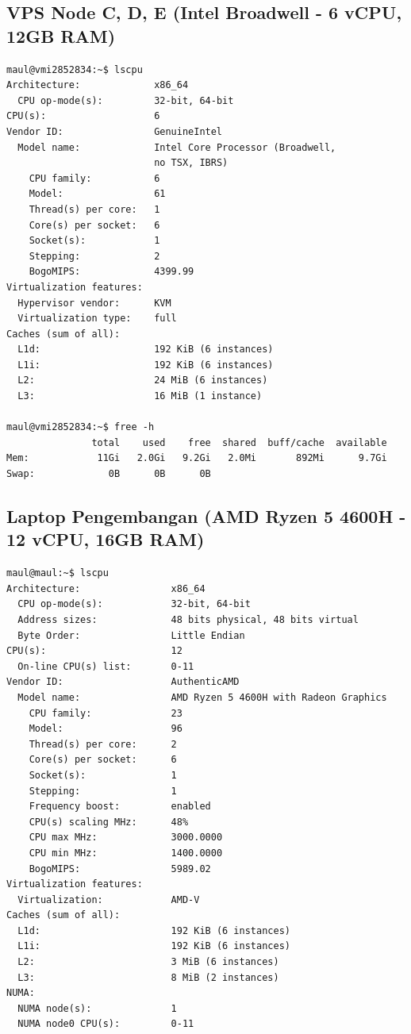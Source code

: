 \subsection{VPS Node C, D, E (Intel Broadwell - 6 vCPU, 12GB RAM)}
\begin{lstlisting}[basicstyle=\footnotesize, breaklines=true, numbers=none]
maul@vmi2852834:~$ lscpu
Architecture:             x86_64
  CPU op-mode(s):         32-bit, 64-bit
CPU(s):                   6
Vendor ID:                GenuineIntel
  Model name:             Intel Core Processor (Broadwell, 
                          no TSX, IBRS)
    CPU family:           6
    Model:                61
    Thread(s) per core:   1
    Core(s) per socket:   6
    Socket(s):            1
    Stepping:             2
    BogoMIPS:             4399.99
Virtualization features:  
  Hypervisor vendor:      KVM
  Virtualization type:    full
Caches (sum of all):      
  L1d:                    192 KiB (6 instances)
  L1i:                    192 KiB (6 instances)
  L2:                     24 MiB (6 instances)
  L3:                     16 MiB (1 instance)

maul@vmi2852834:~$ free -h
               total    used    free  shared  buff/cache  available
Mem:            11Gi   2.0Gi   9.2Gi   2.0Mi       892Mi      9.7Gi
Swap:             0B      0B      0B
\end{lstlisting}
\vspace{1cm}

\subsection{Laptop Pengembangan (AMD Ryzen 5 4600H - 12 vCPU, 16GB RAM)}
\begin{lstlisting}[basicstyle=\footnotesize, breaklines=true, numbers=none]
maul@maul:~$ lscpu
Architecture:                x86_64
  CPU op-mode(s):            32-bit, 64-bit
  Address sizes:             48 bits physical, 48 bits virtual
  Byte Order:                Little Endian
CPU(s):                      12
  On-line CPU(s) list:       0-11
Vendor ID:                   AuthenticAMD
  Model name:                AMD Ryzen 5 4600H with Radeon Graphics
    CPU family:              23
    Model:                   96
    Thread(s) per core:      2
    Core(s) per socket:      6
    Socket(s):               1
    Stepping:                1
    Frequency boost:         enabled
    CPU(s) scaling MHz:      48%
    CPU max MHz:             3000.0000
    CPU min MHz:             1400.0000
    BogoMIPS:                5989.02
Virtualization features:     
  Virtualization:            AMD-V
Caches (sum of all):         
  L1d:                       192 KiB (6 instances)
  L1i:                       192 KiB (6 instances)
  L2:                        3 MiB (6 instances)
  L3:                        8 MiB (2 instances)
NUMA:                        
  NUMA node(s):              1
  NUMA node0 CPU(s):         0-11
\end{lstlisting}